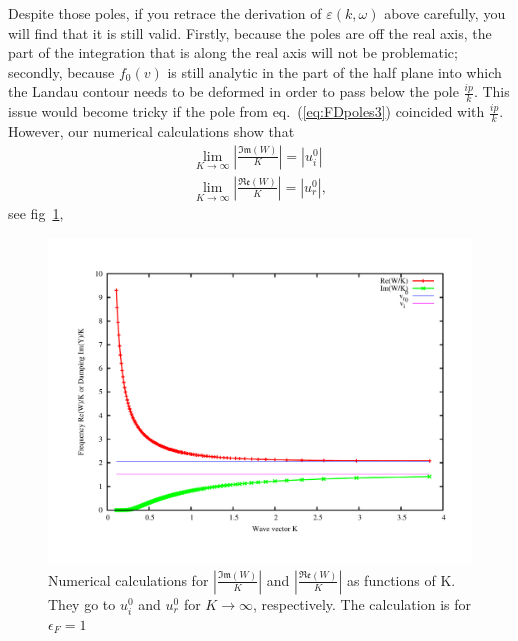 \documentclass[physics,phd,nolot,nolof]{uccthesis}%
\begin{document}
Despite those poles, if you retrace the derivation of $\varepsilon(k,\omega)$ above carefully, you will find that it is still valid.
Firstly, because the poles are off the real axis, the part of the integration that is along the real axis will not be problematic; 
secondly, because $f_0(v)$ is still analytic in the part of the half plane into which the Landau contour needs to be deformed in order to pass below the pole $\frac{ip}{k}$.
This issue would become tricky if the pole from eq.~(\ref{eq:FDpoles3}) coincided with $\frac{ip}{k}$.
However, our numerical calculations show that 
\begin{equation}
	\begin{split}
	\lim\limits_{K\to\infty}|\frac{\mathfrak{Im}(W)}{K}|= |u_i^{0}|\\
	\lim\limits_{K\to\infty}|\frac{\mathfrak{Re}(W)}{K}|= |u_r^{0}|,
\end{split}
	\label{eq:FDlimits}
\end{equation}
see fig~\ref{fig:limits},
\begin{figure}[h]
	\begin{center}
	\includegraphics[width=\textwidth]{limits.pdf}
	\end{center}
	\caption{Numerical calculations for  $|\frac{\mathfrak{Im}(W)}{K}|$ and $|\frac{\mathfrak{Re}(W)}{K}|$ as functions of K. They go to $u_i^0$ and $u_r^0$ for $K\to\infty$, respectively. The calculation is for $\epsilon_F=1$}
	\label{fig:limits}
\end{figure}
\end{document}
